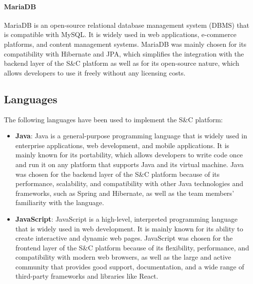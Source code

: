\paragraph{MariaDB}
MariaDB is an open-source relational database management system (DBMS) that is compatible with MySQL. It is widely used in web applications, e-commerce platforms, and content management systems. MariaDB was mainly chosen for its compatibility with Hibernate and JPA, which simplifies the integration with the backend layer of the S\&C platform as well as for its open-source nature, which allows developers to use it freely without any licensing costs. 

\subsection{Languages}
The following languages have been used to implement the S\&C platform:
\begin{itemize}
    \item \textbf{Java}: Java is a general-purpose programming language that is widely used in enterprise applications, web development, and mobile applications. It is mainly known for its portability, which allows developers to write code once and run it on any platform that supports Java and its virtual machine. Java was chosen for the backend layer of the S\&C platform because of its performance, scalability, and compatibility with other Java technologies and frameworks, such as Spring and Hibernate, as well as the team members' familiarity with the language.
    
    \item \textbf{JavaScript}: JavaScript is a high-level, interpreted programming language that is widely used in web development. It is mainly known for its ability to create interactive and dynamic web pages. JavaScript was chosen for the frontend layer of the S\&C platform because of its flexibility, performance, and compatibility with modern web browsers, as well as the large and active community that provides good support, documentation, and a wide range of third-party frameworks and libraries like React.
\end{itemize}





